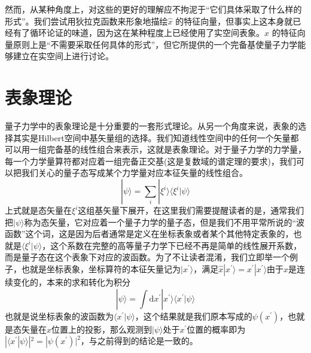 \documentclass[12pt,a4paper,openany,twoside]{book}
\numberwithin{equation}{section}
\newcommand{\ud}{\mathrm{d}}
\begin{document}
        然而，从某种角度上，对这些的更好的理解应不拘泥于“它们具体采取了什么样的形式”。我们尝试用狄拉克函数来形象地描绘$\hat{x}$ 的特征向量，但事实上这本身就已经有了循环论证的味道，因为这在某种程度上已经使用了实空间表象。$\hat{x}$ 的特征向量原则上是“不需要采取任何具体的形式”，但它所提供的一个完备基使量子力学能够建立在实空间上进行讨论。



      \section{表象理论}
        量子力学中的表象理论是十分重要的一套形式理论。从另一个角度来说，表象的选择其实是Hilbert空间中基矢量组的选择。我们知道线性空间中的任何一个矢量都可以用一组完备基的线性组合来表示，这就是表象理论。对于量子力学的力学量，每一个力学量算符都对应着一组完备正交基(这是复数域的谱定理的要求)，我们可以把我们关心的量子态写成某个力学量对应本征矢量的线性组合。
        \begin{equation}
          | \psi \rangle=\sum_{i} | \xi^{i} \rangle\langle\xi^{i} | \psi\rangle
        \end{equation}
        上式就是态矢量在$\xi^{i}$这组基矢量下展开，在这里我们需要提醒读者的是，通常我们把$| \psi \rangle$称为态矢量，它对应着一个量子力学的量子态，但是我们不用平常所说的“波函数”这个词，这是因为后者通常是定义在坐标表象或者某个其他特定表象的，也就是$\langle\xi^{i} | \psi\rangle$，这个系数在完整的高等量子力学下已经不再是简单的线性展开系数，而是量子态在这个表象下对应的波函数。为了不让读者混淆，我们立即举一个例子，也就是坐标表象，坐标算符的本征矢量记为$|x^{\prime}\rangle$，满足$\hat{x}|x^{\prime}\rangle=x^{\prime}|x^{\prime}\rangle$由于$x$是连续变化的，本来的求和转化为积分
        \begin{equation}
          | \psi \rangle=\int \ud x^{\prime} | x^{\prime} \rangle\langle x^{\prime} | \psi\rangle
        \end{equation}
        也就是说坐标表象的波函数为$\langle x^{\prime} | \psi\rangle$，这个结果就是我们原本写成的$\psi(x^{\prime})$，也就是态矢量在$x$位置上的投影，那么观测到$ | \psi \rangle $处于$x^{\prime}$位置的概率即为$|\langle x^{\prime} | \psi\rangle|^2 = |\psi(x^{\prime})|^2$，与之前得到的结论是一致的。
        
\end{document}
